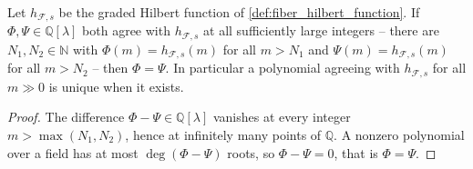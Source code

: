 \begin{lemma}\leanok
  \label{lem:hilbertPolynomial_unique}
  Let \(h_{\mathcal{F},s}\) be the graded Hilbert function of
  \cref{def:fiber_hilbert_function}. If \(\Phi, \Psi \in \mathbb{Q}[\lambda]\)
  both agree with \(h_{\mathcal{F},s}\) at all sufficiently large integers --
  there are \(N_1, N_2 \in \mathbb{N}\) with
  \(\Phi(m) = h_{\mathcal{F},s}(m)\) for all \(m > N_1\) and
  \(\Psi(m) = h_{\mathcal{F},s}(m)\) for all \(m > N_2\) -- then
  \(\Phi = \Psi\). In particular a polynomial agreeing with
  \(h_{\mathcal{F},s}\) for all \(m \gg 0\) is unique when it exists.
\end{lemma}

\begin{proof}
  \leanok
  The difference \(\Phi - \Psi \in \mathbb{Q}[\lambda]\) vanishes at every
  integer \(m > \max(N_1, N_2)\), hence at infinitely many points of
  \(\mathbb{Q}\). A nonzero polynomial over a field has at most
  \(\deg(\Phi - \Psi)\) roots, so \(\Phi - \Psi = 0\), that is
  \(\Phi = \Psi\).
\end{proof}

